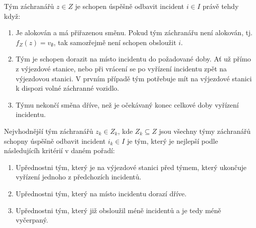 \begin{definice}\label{df:simulacePravidla1}
  Tým záchranářů $z \in Z$ je schopen úspěšně odbavit incident $i \in I$ právě tehdy když:

  \begin{enumerate}
    \item
      Je alokován a má přiřazenou směnu. Pokud tým záchranářu není alokován, tj. $f_Z(z) = v_{\emptyset}$, tak samozřejmě není schopen obsloužit $i$.

    \item
      Tým je schopen dorazit na místo incidentu do požadované doby.
      Ať už přímo z výjezdové stanice, nebo při vrácení se po vyřízení incidentu zpět na výjezdovou stanici. 
      V prvním případě tým potřebuje mít na výjezdové stanici k dispozi volné záchranné vozidlo.

    \item
      Týmu nekončí směna dříve, než je očekávaný konec celkové doby vyřízení incidentu.
  \end{enumerate}
\end{definice}


\begin{definice}\label{df:simulacePravidla2}
  Nejvhodnější tým záchranářů $z_k \in Z_k$, kde $Z_k \subseteq Z$ jsou všechny týmy záchranářů schopny úspěšně odbavit incident $i_k \in I$ je tým,
  který je nejlepší podle následujícíh kritérií v daném pořadí:

  \begin{enumerate}
    \item Upřednostni tým, který je na výjezdové stanici před týmem, který ukončuje vyřízení jednoho z předchozích incidentů. 
    \item Upřednostni tým, který na místo incidentu dorazí dříve. 
    \item Upřednostni tým, který již obsloužil méně incidentů a je tedy méně vyčerpaný.
  \end{enumerate}
\end{definice}

